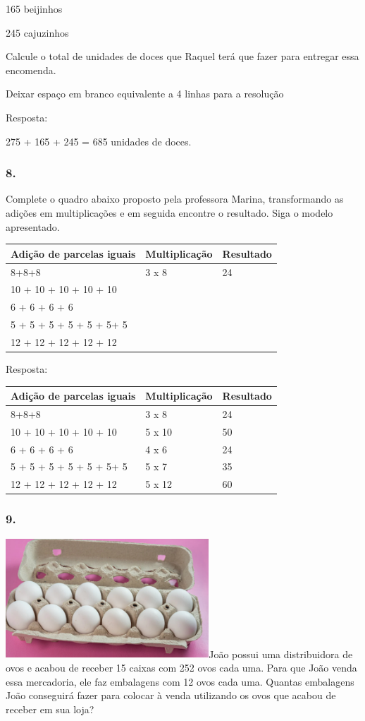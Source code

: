 165 beijinhos

245 cajuzinhos

Calcule o total de unidades de doces que Raquel terá que fazer para
entregar essa encomenda.

Deixar espaço em branco equivalente a 4 linhas para a resolução

Resposta:

275 + 165 + 245 = 685 unidades de doces.

\subsubsection{8.}\label{section-23}

Complete o quadro abaixo proposto pela professora Marina, transformando
as adições em multiplicações e em seguida encontre o resultado. Siga o
modelo apresentado.

\begin{longtable}[]{@{}lll@{}}
\toprule
Adição de parcelas iguais & Multiplicação & Resultado\tabularnewline
\midrule
\endhead
8+8+8 & 3 x 8 & 24\tabularnewline
10 + 10 + 10 + 10 + 10 & &\tabularnewline
6 + 6 + 6 + 6 & &\tabularnewline
5 + 5 + 5 + 5 + 5 + 5+ 5 & &\tabularnewline
12 + 12 + 12 + 12 + 12 & &\tabularnewline
\bottomrule
\end{longtable}

Resposta:

\begin{longtable}[]{@{}lll@{}}
\toprule
Adição de parcelas iguais & Multiplicação & Resultado\tabularnewline
\midrule
\endhead
8+8+8 & 3 x 8 & 24\tabularnewline
10 + 10 + 10 + 10 + 10 & 5 x 10 & 50\tabularnewline
6 + 6 + 6 + 6 & 4 x 6 & 24\tabularnewline
5 + 5 + 5 + 5 + 5 + 5+ 5 & 5 x 7 & 35\tabularnewline
12 + 12 + 12 + 12 + 12 & 5 x 12 & 60\tabularnewline
\bottomrule
\end{longtable}

\subsubsection{9.}\label{section-24}

\includegraphics[width=3.00278in,height=1.75833in]{media/image23.png}João
possui uma distribuidora de ovos e acabou de receber 15 caixas com 252
ovos cada uma. Para que João venda essa mercadoria, ele faz embalagens
com 12 ovos cada uma. Quantas embalagens João conseguirá fazer para
colocar à venda utilizando os ovos que acabou de receber em sua loja?

